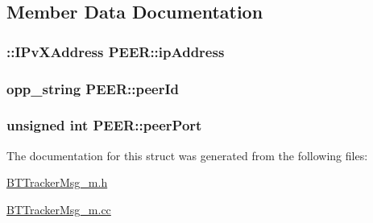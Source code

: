 \subsection{Member Data Documentation}
\hypertarget{structPEER_a867725ed03754bcec1086706377116d1}{}
\subsubsection[{ip\+Address}]{\setlength{\rightskip}{0pt plus 5cm}\+::I\+Pv\+X\+Address P\+E\+E\+R\+::ip\+Address}\label{structPEER_a867725ed03754bcec1086706377116d1}
\hypertarget{structPEER_a519f6e8305967bad664558e1af9d08b9}{}
\subsubsection[{peer\+Id}]{\setlength{\rightskip}{0pt plus 5cm}opp\+\_\+string P\+E\+E\+R\+::peer\+Id}\label{structPEER_a519f6e8305967bad664558e1af9d08b9}
\hypertarget{structPEER_a621cd69e7a189d3b0cada8322c2a22eb}{}
\subsubsection[{peer\+Port}]{\setlength{\rightskip}{0pt plus 5cm}unsigned int P\+E\+E\+R\+::peer\+Port}\label{structPEER_a621cd69e7a189d3b0cada8322c2a22eb}


The documentation for this struct was generated from the following files\+:\begin{DoxyCompactItemize}
\item 
\hyperlink{BTTrackerMsg__m_8h}{B\+T\+Tracker\+Msg\+\_\+m.\+h}\item 
\hyperlink{BTTrackerMsg__m_8cc}{B\+T\+Tracker\+Msg\+\_\+m.\+cc}\end{DoxyCompactItemize}
